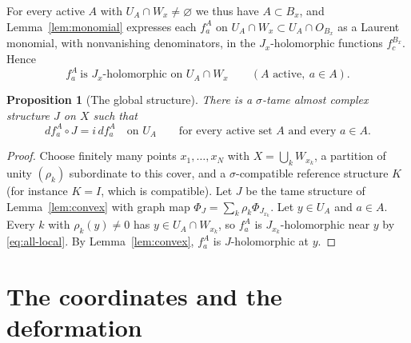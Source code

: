 \documentclass[11pt]{article}
\newtheorem{proposition}[theorem]{Proposition}
\theoremstyle{remark}
\begin{document}
For every active $A$ with $U_A\cap W_x\ne\varnothing$ we thus have
$A\subset B_x$, and Lemma~\ref{lem:monomial} expresses each $f^A_a$ on
$U_A\cap W_x\subset U_A\cap O_{B_x}$ as a Laurent monomial, with
nonvanishing denominators, in the $J_x$-holomorphic functions
$f^{B_x}_c$. Hence
\begin{equation}\label{eq:all-local}
 f^A_a\ \text{is $J_x$-holomorphic on }U_A\cap W_x
 \qquad(A\text{ active},\ a\in A).
\end{equation}

\begin{proposition}[The global structure]\label{prop:global}
There is a $\sigma$-tame almost complex structure $J$ on $X$ such that
\begin{equation}\label{eq:finalhol}
 df^A_a\circ J=i\,df^A_a\quad\text{on }U_A
 \qquad\text{for every active set $A$ and every }a\in A.
\end{equation}
\end{proposition}

\begin{proof}
Choose finitely many points $x_1,\dots,x_N$ with
$X=\bigcup_kW_{x_k}$, a partition of unity $(\rho_k)$ subordinate to
this cover, and a $\sigma$-compatible reference structure $K$ (for
instance $K=I$, which is compatible). Let $J$ be the tame structure of
Lemma~\ref{lem:convex} with graph map
$\Phi_J=\sum_k\rho_k\Phi_{J_{x_k}}$. Let $y\in U_A$ and $a\in A$. Every $k$
with $\rho_k(y)\ne0$ has $y\in U_A\cap W_{x_k}$, so $f^A_a$ is
$J_{x_k}$-holomorphic near $y$ by \eqref{eq:all-local}. By
Lemma~\ref{lem:convex}, $f^A_a$ is $J$-holomorphic at $y$.
\end{proof}

\section{The coordinates and the deformation}\label{sec:end}
\end{document}
